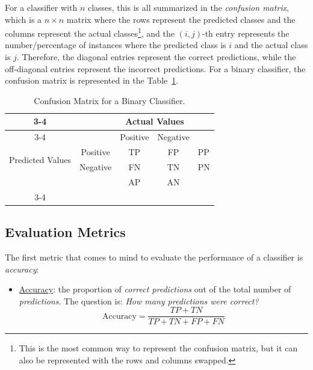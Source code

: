 For a classifier with $n$ classes, this is all summarized in the \emph{confusion matrix}, which is a $n \times n$ matrix where the rows represent the predicted classes and the columns represent the actual classes\footnote{This is the most common way to represent the confusion matrix, but it can also be represented with the rows and columns swapped.}, and the $(i, j)$-th entry represents the number/percentage of instances where the predicted class is $i$ and the actual class is $j$. Therefore, the diagonal entries represent the correct predictions, while the off-diagonal entries represent the incorrect predictions. 
For a binary classifier, the confusion matrix is represented in the Table~\ref{tab:confusion-matrix}.
\begin{table}
    \centering
    \caption{Confusion Matrix for a Binary Classifier.}
    \label{tab:confusion-matrix}
\begin{tabular}{@{}cc|cc|c@{}}
\cmidrule(lr){3-4}
                                                        &          & \multicolumn{2}{c|}{Actual Values} &                         \\ \cmidrule(lr){3-4}
                                                        &          & Positive         & Negative        &                         \\ \midrule
\multicolumn{1}{|l|}{\multirow{2}{*}{Predicted Values}} & Positive & \cellcolor[HTML]{C0C0C0}TP               & \cellcolor[HTML]{C0C0C0}FP              & \multicolumn{1}{l|}{PP} \\
\multicolumn{1}{|l|}{}                                  & Negative & \cellcolor[HTML]{C0C0C0}FN               & \cellcolor[HTML]{C0C0C0}TN              & \multicolumn{1}{l|}{PN} \\ \midrule
                                                        &          & AP               & AN              &                         \\ \cmidrule(lr){3-4}
\end{tabular}
\end{table}

\subsection{Evaluation Metrics}

The first metric that comes to mind to evaluate the performance of a classifier is \emph{accuracy}:
\begin{itemize}
    \item \ul{Accuracy}: the proportion of \emph{correct predictions} out of the {total} number of \emph{predictions}. The question is: \emph{How many predictions were correct?}
    \begin{equation}
        \label{label:accuracy}
        \text{Accuracy} = \frac{TP + TN}{TP + TN + FP + FN}
    \end{equation}
\end{itemize}

